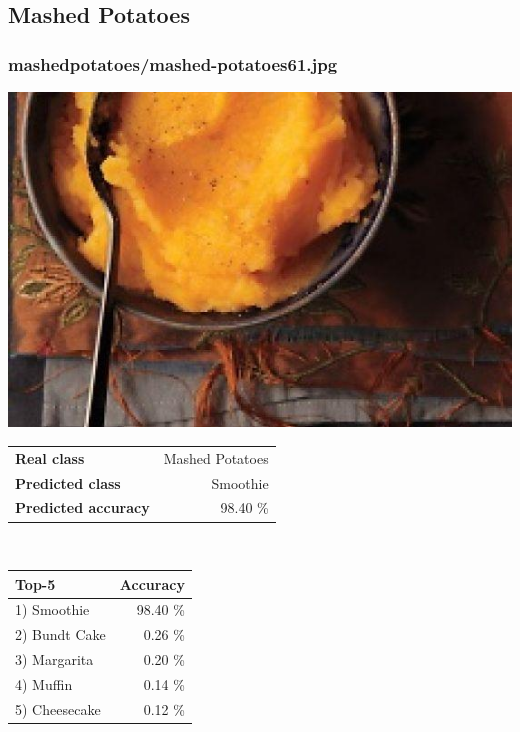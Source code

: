 \subsection{Mashed Potatoes}
    
\subsubsection{mashed\textunderscore potatoes/mashed-potatoes61.jpg}

\begin{minipage}[t]{0.4\textwidth}
	\vspace{0pt}
	\includegraphics[width=\linewidth]{images/evaluation-images/mashed_potatoes/mashed-potatoes61.jpg}
\end{minipage}
\hfill
\begin{minipage}[t]{0.5\textwidth}
	\vspace{0pt}\raggedright
	\begin{tabularx}{\textwidth}{X r}
		\small \textbf{Real class} & \small Mashed Potatoes\\
		\small \textbf{Predicted class} & \small Smoothie\\
		\small \textbf{Predicted accuracy} & \small 98.40 \%
    \end{tabularx}\\
    
    \vspace{6pt}
	\begin{tabularx}{\textwidth}{X r}
        \small \textbf{Top-5} & \small \textbf{Accuracy} \\
        \hline
		\small 1) Smoothie & \small 98.40 \%\\\small 2) Bundt Cake & \small 0.26 \%\\\small 3) Margarita & \small 0.20 \%\\\small 4) Muffin & \small 0.14 \%\\\small 5) Cheesecake & \small 0.12 \%
    \end{tabularx}
\end{minipage}
    
